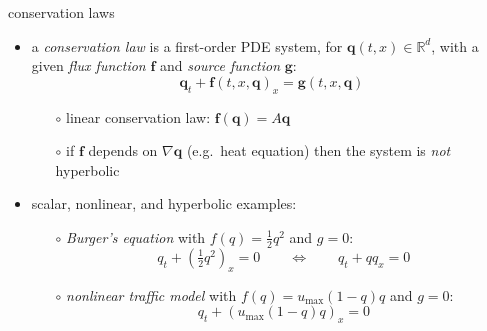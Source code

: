 \documentclass[10pt,dvipsnames,usepdftitle=false,
hyperref={pdftitle = {Finite volume methods},
    pdfauthor = {Ed Bueler}}]{beamer}
\newcommand{\bbf}{\mathbf{f}}
\newcommand{\bg}{\mathbf{g}}
\newcommand{\bq}{\mathbf{q}}
\newcommand{\grad}{\nabla}
\newcommand{\RR}{\mathbb{R}}
\begin{document}
\begin{frame}{conservation laws}

\begin{itemize}
\item a \emph{conservation law} is a first-order PDE system, for $\bq(t,x) \in \RR^d$, with a given \emph{flux function} $\bbf$ and \emph{source function} $\bg$:
  $$\bq_t + \bbf(t,x,\bq)_x=\bg(t,x,\bq)$$
    \begin{itemize}
    \item[$\circ$] linear conservation law: \qquad $\bbf(\bq) = A\bq$
    \item[$\circ$] if $\bbf$ depends on $\grad \bq$ (e.g.~heat equation) then the system is \emph{not} hyperbolic
    \end{itemize}

\bigskip
\item scalar, nonlinear, and hyperbolic examples:
    \begin{itemize}
    \item[$\circ$] \emph{Burger's equation} with $f(q)=\frac{1}{2} q^2$ and $g=0$:
        $$q_t + \left(\tfrac{1}{2} q^2\right)_x = 0 \qquad \iff \qquad q_t + q q_x = 0$$
    \item[$\circ$] \emph{nonlinear traffic model} with $f(q)=u_{\max} (1-q) q$ and $g=0$:
        $$q_t + \left(u_{\max} (1-q) q\right)_x = 0$$
    \end{itemize}
\end{itemize}
\end{frame}
\end{document}
